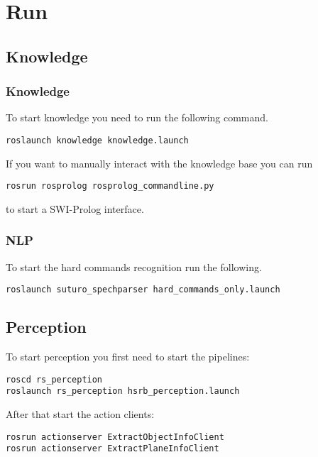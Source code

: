 \documentclass[main.tex]{subfiles}
\begin{document}
	\section{Run}
	\subsection{Knowledge}
	\subsubsection{Knowledge}
	To start knowledge you need to run the following command.
	\begin{lstlisting}
roslaunch knowledge knowledge.launch
\end{lstlisting}
If you want to manually interact with the knowledge base you can run 
\begin{lstlisting}
rosrun rosprolog rosprolog_commandline.py
\end{lstlisting}
to start a SWI-Prolog interface.
	
	\subsubsection{NLP}
	
	To start the hard commands recognition run the following.
	
	\begin{lstlisting}
roslaunch suturo_spechparser hard_commands_only.launch
\end{lstlisting}
	
	\subsection{Perception}

	To start perception you first need to start the pipelines:
	\begin{lstlisting}
roscd rs_perception
roslaunch rs_perception hsrb_perception.launch
\end{lstlisting}	

After that start the action clients:
\begin{lstlisting}
rosrun actionserver ExtractObjectInfoClient
rosrun actionserver ExtractPlaneInfoClient
\end{lstlisting}
\end{document}
